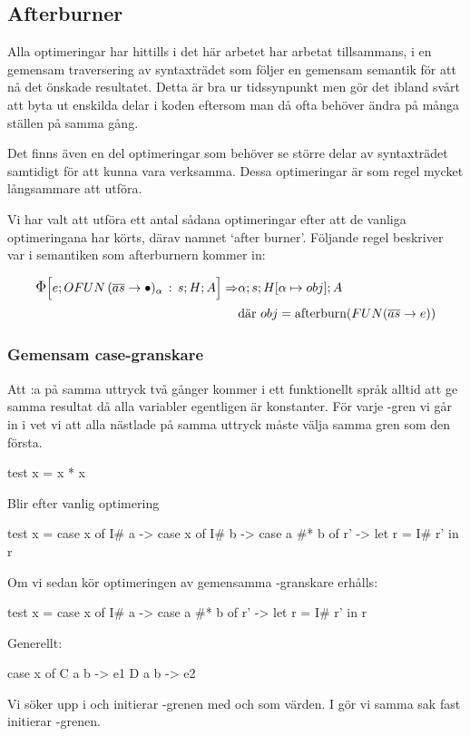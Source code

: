 \documentclass[../Optimise]{subfiles}
\begin{document}
\subsection{Afterburner}

Alla optimeringar har hittills i det här arbetet har arbetat tillsammans, i en gemensam
traversering av syntaxträdet som följer en gemensam semantik för att nå det önskade resultatet. 
Detta är bra ur tidssynpunkt men gör det ibland svårt att byta ut enskilda delar i koden
eftersom man då ofta behöver ändra på många ställen på samma gång.

Det finns även en del optimeringar som behöver se större delar av syntaxträdet
samtidigt för att kunna vara verksamma. Dessa optimeringar är som regel mycket långsammare att utföra.

Vi har valt att utföra ett antal sådana optimeringar efter att de vanliga
optimeringana har körts, därav namnet `after burner'. Följande regel beskriver
var i semantiken som afterburnern kommer in:

\begin{align*}
\CBNIRR{\cOFUN{\overline{as}}{\alpha}s}HAe \Rightarrow & \CBNMC{\alpha}{s}{\heap{\alpha}{obj}}A \\
 & \text{där } obj = \text{afterburn} (\FUN{\overline{as}}e)
\end{align*}

\subsubsection{Gemensam case-granskare}

Att :a på samma uttryck två gånger kommer i ett funktionellt språk alltid att ge
samma resultat då alla variabler egentligen är konstanter. För varje -gren
vi går in i vet vi att alla nästlade  på samma uttryck måste välja samma
gren som den första.

\begin{codeEx}
test x = x * x
\end{codeEx}

Blir efter vanlig optimering

\begin{codeEx}
test x = case x of
            I# a -> case x of
                I# b -> case a #* b of
                    r' -> let r = I# r'
                            in r
\end{codeEx}

Om vi sedan kör optimeringen av gemensamma -granskare erhålls:
\begin{codeEx}
test x = case x of
            I# a -> case a #* b of
                r' -> let r = I# r'
                    in r
\end{codeEx}

Generellt:
		\begin{codeEx}
case x of
    C a b -> e1
    D a b -> e2
\end{codeEx}

Vi söker upp  i  och initierar 
-grenen med  och  som värden. I  gör vi samma sak fast initierar -grenen.
\end{document}
